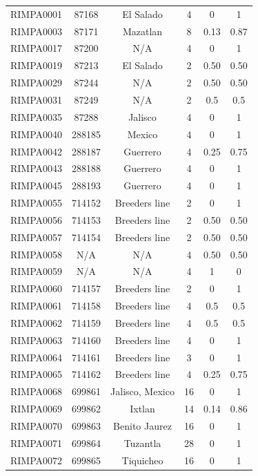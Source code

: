 \documentclass[11pt]{article}
\newcounter{rowno}
\begin{document}
\begin{scriptsize}
\begin{longtable}{>{\stepcounter{rowno}}cccccc}
    RIMPA0001 & 87168 & El Salado & 4     & 0     & 1 \\
    RIMPA0003 & 87171 & Mazatlan & 8 & 0.13 & 0.87 \\
    RIMPA0017 & 87200 & N/A   & 4     & 0     & 1 \\
    RIMPA0019 & 87213 & El Salado & 2     & 0.50   & 0.50 \\
    RIMPA0029 & 87244 & N/A   & 2     & 0.50   & 0.50 \\
    RIMPA0031 & 87249 & N/A   & 2     & 0.5   & 0.5 \\
    RIMPA0035 & 87288 & Jalisco & 4     & 0     & 1 \\
    RIMPA0040 & 288185 & Mexico & 4     & 0     & 1 \\
    RIMPA0042 & 288187 & Guerrero & 4     & 0.25  & 0.75 \\
    RIMPA0043 & 288188 & Guerrero & 4     & 0     & 1 \\
    RIMPA0045 & 288193 & Guerrero & 4     & 0     & 1 \\
    RIMPA0055 & 714152 & Breeders line & 2     & 0     & 1 \\
    RIMPA0056 & 714153 & Breeders line & 2     & 0.50   & 0.50 \\
    RIMPA0057 & 714154 & Breeders line & 2     & 0.50   & 0.50 \\
    RIMPA0058 & N/A   & N/A   & 4     & 0.50   & 0.50 \\
    RIMPA0059 & N/A   & N/A   & 4     & 1     & 0 \\
    RIMPA0060 & 714157 & Breeders line & 2     & 0     & 1 \\
    RIMPA0061 & 714158 & Breeders line & 4     & 0.5   & 0.5 \\
    RIMPA0062 & 714159 & Breeders line & 4     & 0.5   & 0.5 \\
    RIMPA0063 & 714160 & Breeders line & 4     & 0     & 1 \\
    RIMPA0064 & 714161 & Breeders line & 3     & 0     & 1 \\
    RIMPA0065 & 714162 & Breeders line & 4     & 0.25  & 0.75 \\
    RIMPA0068 & 699861 & Jalisco, Mexico & 16    & 0     & 1 \\
    RIMPA0069 & 699862 & Ixtlan & 14    & 0.14 & 0.86 \\
    RIMPA0070 & 699863 & Benito Jaurez & 16    & 0     & 1 \\
    RIMPA0071 & 699864 & Tuzantla & 28    & 0     & 1 \\
    RIMPA0072 & 699865 & Tiquicheo & 16    & 0     & 1 \\

\end{longtable}
\end{scriptsize}
\end{document}
